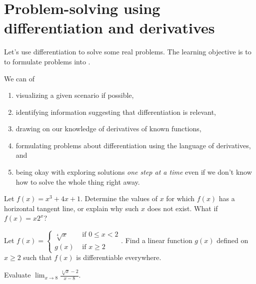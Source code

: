 \documentclass[../main.tex]{subfiles}
\begin{document}
 \section{Problem-solving using differentiation and derivatives}
  Let's use differentiation to solve some real problems. The learning objective is to  to formulate problems into .

  \label{page:diff-problem-solving}
  We can  of
  \begin{enumerate}
    \item visualizing a given scenario if possible, 
    \item identifying information suggesting that differentiation is relevant, 
    \item drawing on our knowledge of derivatives of known functions, 
    \item formulating problems about differentiation using the language of derivatives, and
    \item being okay with exploring solutions \emph{one step at a time} even if we don't know how to solve the whole thing right away.
  \end{enumerate}

  \bigskip
  \begin{example}
    Let \(f(x) = x^{3} + 4x + 1\).  Determine the values of \(x\) for which \(f(x)\) has a horizontal tangent line, or explain why such \(x\) does not exist. What if \(f(x) = x 2^{x}\)?

  \end{example}
  \vfill{}
  \clearpage


  \begin{example}
    Let \(f(x) = \begin{cases} \sqrt[4]{x} &\text{ if } 0 \le x < 2 \\ g(x) &\text{ if } x \ge 2 \end{cases}\). Find a linear function \(g(x)\) defined on \(x \ge 2\) such that \(f(x)\) is differentiable everywhere.

  \end{example}


  \begin{example}
    Evaluate \(\lim_{x \to 8} \frac{\sqrt[3]{x} - 2}{x - 8}\).

  \end{example}
  \clearpage
\end{document}
